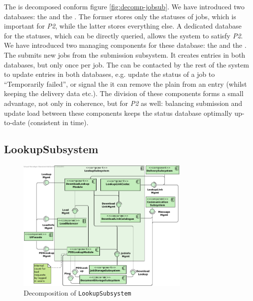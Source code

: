 The  is decomposed conform figure \ref{fig:decomp-jobsub}. We have introduced two databases: the  and the . The former stores only the statuses of jobs, which is important for \emph{P2}, while the latter stores everything else. A dedicated database for the statuses, which can be directly queried, allows the system to satisfy \emph{P2}. We have introduced two managing components for these database: the  and the . The  submits new jobs from the submission subsystem. It creates entries in both databases, but only once per job. The  can be contacted by the rest of the system to update entries in both databases, e.g. update the status of a job to ``Temporarily failed'', or signal the  it can remove the plain  from an entry (whilst keeping the delivery data etc.). The division of these components forms a small advantage, not only in coherence, but for \emph{P2} as well: balancing submission and update load between these components keeps the status database optimally up-to-date (consistent in time).

\subsection{LookupSubsystem}
\begin{figure}[!htp]
    \centering
    \includegraphics[width=0.75\textwidth]{figures/Lookup Subsystem.png}
    \caption{Decomposition of \texttt{LookupSubsystem}}\label{fig:decomp-lookupsub}
\end{figure}

